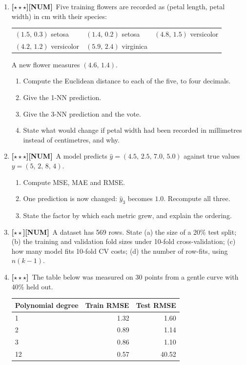 \documentclass[11pt,a4paper]{article}
\newcommand{\LA}{{\footnotesize\textbf{[$\star\star\star$]}}}
\newcommand{\LB}{{\footnotesize\textbf{[$\star\star$]}}}
\newcommand{\NUM}{{\footnotesize\textbf{[NUM]}}}
\newcommand{\Q}[1]{\item[\textbf{#1}]}
\begin{document}
\begin{enumerate}[leftmargin=2.2cm]
\Q{U1.14}\LA\NUM\ Five training flowers are recorded as (petal length, petal
  width) in cm with their species:
  \begin{center}\begin{tabular}{@{}lll@{}}\toprule
  $(1.5,\,0.3)$ setosa & $(1.4,\,0.2)$ setosa & $(4.8,\,1.5)$ versicolor\\
  $(4.2,\,1.2)$ versicolor & $(5.9,\,2.4)$ virginica & \\
  \bottomrule\end{tabular}\end{center}
  A new flower measures $(4.6,\,1.4)$.
  \begin{enumerate}[label=(\alph*)]
    \item Compute the Euclidean distance to each of the five, to four decimals.
    \item Give the 1-NN prediction.
    \item Give the 3-NN prediction and the vote.
    \item State what would change if petal width had been recorded in
      millimetres instead of centimetres, and why.
  \end{enumerate}
\Q{U1.15}\LA\NUM\ A model predicts $\hat y = (4.5,\,2.5,\,7.0,\,5.0)$ against
  true values $y = (5,\,2,\,8,\,4)$.
  \begin{enumerate}[label=(\alph*)]
    \item Compute MSE, MAE and RMSE.
    \item One prediction is now changed: $\hat y_3$ becomes $1.0$. Recompute
      all three.
    \item State the factor by which each metric grew, and explain the ordering.
  \end{enumerate}
\Q{U1.16}\LB\NUM\ A dataset has 569 rows. State (a) the size of a 20\% test
  split; (b) the training and validation fold sizes under 10-fold
  cross-validation; (c) how many model fits 10-fold CV costs; (d) the number of
  row-fits, using $n(k-1)$.
\Q{U1.17}\LA\ The table below was measured on 30 points from a gentle curve
  with 40\% held out.
  \begin{center}\begin{tabular}{@{}lrr@{}}\toprule
  \textbf{Polynomial degree} & \textbf{Train RMSE} & \textbf{Test RMSE}\\
  \midrule
  1 & 1.32 & 1.60\\ 2 & 0.89 & 1.14\\ 3 & 0.86 & 1.10\\ 12 & 0.57 & 40.52\\

\end{tabular}
\end{center}
\end{enumerate}
\end{document}
